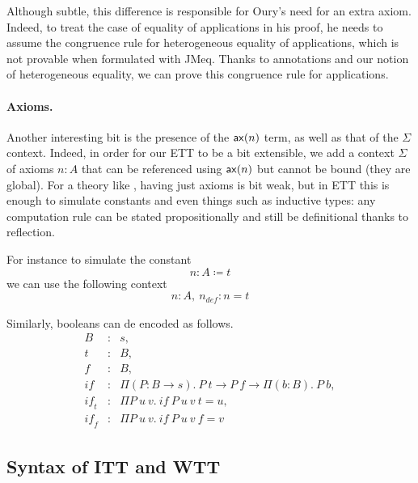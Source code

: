 Although subtle, this difference is responsible for Oury's need for an
extra axiom. Indeed, to treat the case of equality of applications in
his proof, he needs to assume the congruence rule for heterogeneous
equality of applications, which is not provable when formulated with
\acrshort{JMeq}. Thanks to annotations and our notion of heterogeneous equality,
we can prove this congruence rule for applications.

\paragraph{Axioms.}

Another interesting bit is the presence of the \(\mathsf{ax}(n)\) term, as well as
that of the \(\Sigma\) context. Indeed, in order for our \acrshort{ETT} to be
a bit extensible, we add a context \(\Sigma\) of axioms \(n : A\) that can be
referenced using \(\mathsf{ax}(n)\) but cannot be bound (they are global).
For a theory like \Coq, having just axioms is bit weak, but in \acrshort{ETT}
this is enough to simulate constants and even things such as inductive types:
any computation rule can be stated propositionally and still be definitional
thanks to reflection.

For instance to simulate the constant
\[
  n : A \coloneqq t
\]
we can use the following context
\[
  n : A,\ n_{\mathit{def}} : n = t
\]

Similarly, booleans can de encoded as follows.
\[
  \begin{array}{lcl}
    B &:& s, \\
    t &:& B, \\
    f &:& B, \\
    \mathit{if} &:& \Pi (P : B \to s).\ P\ t \to P\ f \to \Pi (b : B).\ P\ b, \\
    \mathit{if_t} &:& \Pi P\ u\ v.\ \mathit{if}\ P\ u\ v\ t = u, \\
    \mathit{if_f} &:& \Pi P\ u\ v.\ \mathit{if}\ P\ u\ v\ f = v
  \end{array}
\]

\subsection{Syntax of \acrshort{ITT} and \acrshort{WTT}}

